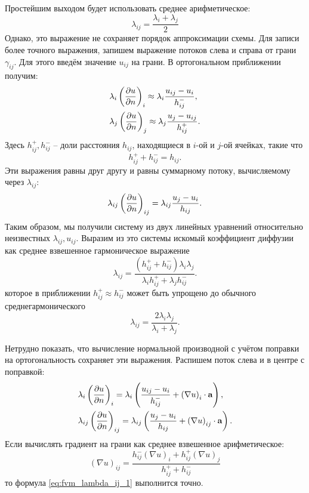 Простейшим выходом будет использовать среднее арифметическое:
\begin{equation}
\label{eq:fvm_lambda_ij_0}
\lambda_{ij} = \frac{\lambda_{i} + \lambda_{j}}{2}
\end{equation}
Однако, это выражение не сохраняет порядок аппроксимации схемы.
Для записи более точного выражения, запишем выражение потоков слева и справа от грани $\gamma_{ij}$.
Для этого введём значение $u_{ij}$ на грани. В ортогональном приближении получим:
\begin{align*}
&\lambda_i \left( \frac{\partial u}{\partial n} \right)_i \approx \lambda_{i}\frac{u_{ij} - u_i}{h_{ij}^-} , \\
&\lambda_j \left( \frac{\partial u}{\partial n} \right)_j \approx \lambda_{j}\frac{u_{j} - u_{ij}}{h_{ij}^+}.
\end{align*}
Здесь $h_{ij}^+, h_{ij}^-$ -- доли расстояния $h_{ij}$, находящиеся в $i$-ой и $j$-ой ячейках, такие что 
$$h_{ij}^+ + h_{ij}^- = h_{ij}.$$
Эти выражения равны друг другу и равны суммарному потоку, вычисляемому через $\lambda_{ij}$:
\begin{equation}
\label{eq:fvm_dudn_lambda}
\lambda_{ij} \left(\frac{\partial u}{\partial n}\right)_{ij} = \lambda_{ij} \frac{u_j - u_i}{h_{ij}}.
\end{equation}
Таким образом, мы получили систему из двух линейных уравнений
относительно неизвестных $\lambda_{ij}, u_{ij}$.
Выразим из это системы искомый коэффициент диффузии как среднее взвешенное гармоническое выражение
\begin{equation}
\label{eq:fvm_lambda_ij_1}
\lambda_{ij} = \frac{(h^+_{ij} + h^-_{ij}) \lambda_i \lambda_j}{\lambda_i h^+_{ij} + \lambda_j h^-_{ij}}.
\end{equation}
которое в приближении $h^+_{ij} \approx h^-_{ij}$ может быть упрощено до обычного среднегармонического
\begin{equation}
\label{eq:fvm_lambda_ij_2}
\lambda_{ij} = \frac{2\lambda_i\lambda_j}{\lambda_i + \lambda_j}.
\end{equation}

Нетрудно показать, что вычисление нормальной производной с учётом поправки на ортогональность
сохраняет эти выражения. Распишем поток слева и в центре с поправкой:
\begin{align*}
&\lambda_i \left( \frac{\partial u}{\partial n} \right)_i = \lambda_{i}\left(\frac{u_{ij} - u_i}{h_{ij}^-} + \left(\nabla u\right)_i \cdot \boldsymbol{\rm a}\right), \\
&\lambda_{ij} \left(\frac{\partial u}{\partial n}\right)_{ij} = \lambda_{ij} \left(\frac{u_j - u_i}{h_{ij}} + \left(\nabla u\right)_{ij} \cdot \boldsymbol{\rm a}\right).
\end{align*}
Если вычислять градиент на грани
как среднее взвешенное арифметическое:
\begin{equation*}
\left(\nabla u\right)_{ij} = \frac{h^-_{ij} \left(\nabla u\right)_i + h^+_{ij} \left(\nabla u\right)_j}{h^+_{ij} + h^-_{ij}}
\end{equation*}
то формула \cref{eq:fvm_lambda_ij_1} выполнится точно.

